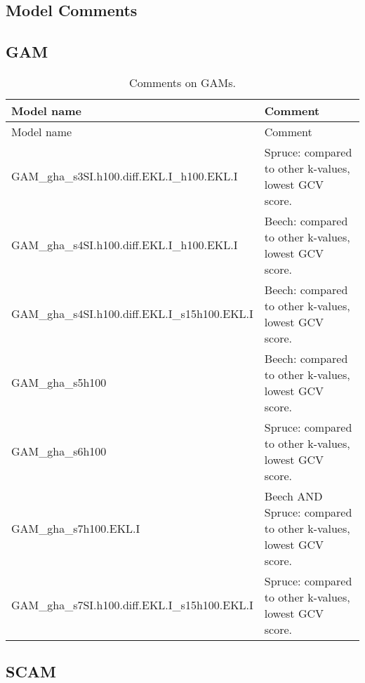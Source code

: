 \begin{landscape}

  \section{Model Comments}

  \subsection{GAM}

  \begin{singlespace}
    {\tabulinesep=2mm
      \begin{longtabu}{l L}
        \caption{Comments on GAMs.} \\
        \toprule
        Model name & Comment \\
        \midrule
        \endfirsthead
        Model name & Comment \\
        \midrule
        \endhead
        \bottomrule
        \endlastfoot
        GAM\_gha\_s3SI.h100.diff.EKL.I\_h100.EKL.I &  Spruce: compared to other k-values, lowest GCV score. \\
        GAM\_gha\_s4SI.h100.diff.EKL.I\_h100.EKL.I & Beech: compared to other k-values, lowest GCV score. \\
        GAM\_gha\_s4SI.h100.diff.EKL.I\_s15h100.EKL.I & Beech: compared to other k-values, lowest GCV score. \\
        GAM\_gha\_s5h100 & Beech: compared to other k-values, lowest GCV score. \\
        GAM\_gha\_s6h100 & Spruce: compared to other k-values, lowest GCV score. \\
        GAM\_gha\_s7h100.EKL.I & Beech AND Spruce: compared to other k-values, lowest GCV score. \\
        GAM\_gha\_s7SI.h100.diff.EKL.I\_s15h100.EKL.I & Spruce: compared to other k-values, lowest GCV score.
      \end{longtabu}
    }
  \end{singlespace}
  
  \subsection{SCAM}


\end{landscape}
